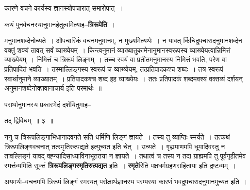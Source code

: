 \documentclass[article,12pt,a4paper]{memoir}
\begin{document}
	  \pstart कारणे वचने कार्यस्य ज्ञानस्योपचारात् समारोपात् ।
	\pend
      

	  \pstart कथं पुनर्वचनस्यानुमानहेतुत्वमित्याह--\textbf{त्रिरूपेति} ।
	\pend
	  \bigskip
	  \begingroup
	

	  \pstart मनुमानशब्देनोच्यते । औपचारिकं वचनमनुमानम्, न मुख्यमित्यर्थः । न यावत् किंचिदुपचारादनुमानशब्देन वक्तुं शक्यं तावत् सर्वं व्याख्येयम् । किन्त्वनुमानं व्याख्यातुकामेनानुमानस्वरूपस्य व्याख्येयत्वान्निमित्तं व्याख्येयम् । निमित्तं च त्रिरूपं लिङ्गम् । तच्च स्वयं वा प्रतीतमनुमानस्य निमित्तं भवति, परेण वा प्रतिपादितं भवति । तस्माल्लिङ्गस्य स्वरूपं च व्याख्येयम्, तत्प्रतिपादकश्च शब्दः । तत्र स्वरूपं स्वार्थानुमाने व्याख्यातम् । प्रतिपादकश्च शब्द इह व्याख्येयः । ततः प्रतिपादकं शब्दमवश्यं वक्तव्यं दर्शयन् अनुमानशब्देनोक्तवानाचार्य इति परमार्थः ॥
	\pend
        

	  \pstart परार्थानुमानस्य प्रकारभेदं दर्शयितुमाह--
	\pend
      
	  \endgroup
	
	  \bigskip
	  \begingroup
	

	  \pstart तद् द्विविधम् ॥ ३ ॥
	\pend
      
	  \endgroup
	

	  \pstart ननु च त्रिरूपलिङ्गाभिधानादवगते सति धर्मिणि लिङ्गं ज्ञायते । तस्य तु व्याप्तिः स्मर्यते । तत्कथं त्रिरूपलिङ्गवचनात् तत्स्मृतिरुत्पद्यते इत्युच्यत इति चेत् । उच्यते । गृह्यमाणमपि धूमादिवस्तु न तावल्लिङ्गं यावद् वह्न्यादिसाध्याविनाभूततया न ज्ञायते । तथात्वं च तस्य न तदा ग्राह्यमपि तु पूर्वगृहीतमेव स्मर्त्तव्यमिति सूक्तं \textbf{त्रिरूपलिङ्गस्मृतिरुत्पद्यत} इति । \textbf{स्मृते}रिति पक्षधर्मग्रहणसहिताया इति द्रष्टव्यम् ।
	\pend
      

	  \pstart अयमर्थः--वचनमपि त्रिरूपं लिङ्गं स्मरयत् परोक्षार्थज्ञानस्य परम्परया कारणं भवदुपचारादनुमानमुच्यत इति ।
	\pend
      
\end{document}
